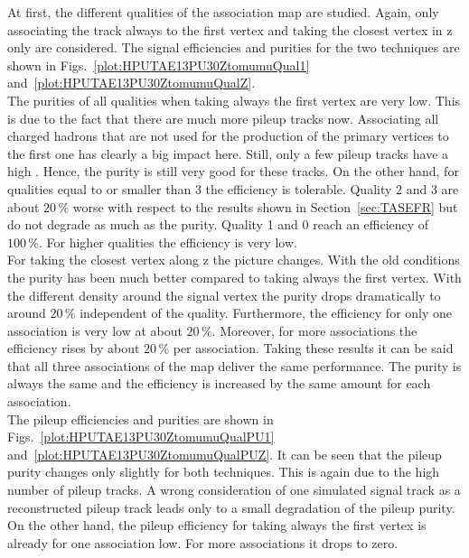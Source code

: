 At first, the different qualities of the association map are studied. Again, only associating the track always to the first vertex and taking the closest vertex in z only are considered. The signal efficiencies and purities for the two techniques are shown in Figs.~\ref{plot:HPUTAE13PU30ZtomumuQual1} and~\ref{plot:HPUTAE13PU30ZtomumuQualZ}. \\
The purities of all qualities when taking always the first vertex are very low. This is due to the fact that there are much more pileup tracks now. Associating all charged hadrons that are not used for the production of the primary vertices to the first one has clearly a big impact here. Still, only a few pileup tracks have a high \pt{}. Hence, the purity is still very good for these tracks. On the other hand, for qualities equal to or smaller than 3 the efficiency is tolerable. Quality 2 and 3  are about $20\,\%$ worse with respect to the results shown in Section~\ref{sec:TASEFR} but do not degrade as much as the purity. Quality 1 and 0 reach an efficiency of $100\,\%$. For higher qualities the efficiency is very low. \\
For taking the closest vertex along z the picture changes. With the old conditions the purity has been much better compared to taking always the first vertex. With the different density around the signal vertex the purity drops dramatically to around $20\,\%$ independent of the quality. Furthermore, the efficiency for only one association is very low at about $20\,\%$. Moreover, for more associations the efficiency rises by about $20\,\%$ per association. Taking these results it can be said that all three associations of the map deliver the same performance. The purity is always the same and the efficiency is increased by the same amount for each association. \\
The pileup efficiencies and purities are shown in Figs.~\ref{plot:HPUTAE13PU30ZtomumuQualPU1} and~\ref{plot:HPUTAE13PU30ZtomumuQualPUZ}. It can be seen that the pileup purity changes only slightly for both techniques. This is again due to the high number of pileup tracks. A wrong consideration of one simulated signal track as a reconstructed pileup track leads only to a small degradation of the pileup purity. On the other hand, the pileup efficiency for taking always the first vertex is already for one association low. For more associations it drops to zero. \\
